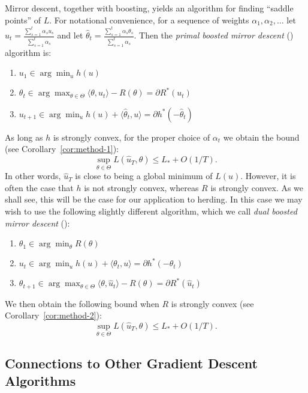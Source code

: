 \documentclass[paper.tex]{subfiles}
\begin{document}
Mirror descent, together with boosting, yields an algorithm for finding 
``saddle points'' of $L$. 
For notational convenience, for a sequence of weights $\alpha_1,\alpha_2,\ldots$ 
let $\hat{u}_t = \frac{\sum_{s=1}^t \alpha_su_s}{\sum_{s=1}^t \alpha_s}$ and let 
$\hat{\theta}_t = \frac{\sum_{s=1}^t \alpha_s\theta_s}{\sum_{s=1}^t \alpha_s}$. Then 
the {\em primal boosted mirror descent} (\primal) algorithm is:
\begin{enumerate}
\item $u_1 \in \arg\min_u h(u)$
\item $\theta_{t} \in \arg\max_{\theta \in \Theta} \langle \theta, u_t \rangle - R(\theta) = \partial R^{*}(u_{t})$
\item $u_{t+1} \in \arg\min_{u} h(u) + \langle \hat{\theta}_t, u \rangle = \partial h^{*}(-\hat\theta_{t})$
\end{enumerate}
As long as $h$ is strongly convex, for the proper choice of $\alpha_{t}$ we obtain the 
bound (see Corollary~\ref{cor:method-1}):
\begin{equation}
\sup_{\theta \in \Theta} L(\hat{u}_T, \theta) \leq L_{*} + O(1/T).
\end{equation}
In other words, $\hat{u}_T$ is close to being a global minimum of $L(u)$.
However, it is often the case that $h$ is not strongly convex, whereas $R$ is strongly convex. As we shall see, this will be the case for our application to herding.
In this case we may wish to use the following slightly different algorithm, which we call {\em dual boosted mirror descent} (\dual):
\begin{enumerate}
\item $\theta_1 \in \arg\min_{\theta} R(\theta)$
\item $u_t \in \arg\min_{u} h(u) + \langle \theta_t, u \rangle = \partial h^{*}(-\theta_{t})$
\item $\theta_{t+1} \in \arg\max_{\theta \in \Theta} \langle \theta, \hat{u}_t \rangle - R(\theta) = \partial R^{*}(\hat u_{t})$
\end{enumerate}
We then obtain the following bound 
when $R$ is strongly convex (see Corollary~\ref{cor:method-2}):
\[ \sup_{\theta \in \Theta} L(\hat{u}_T, \theta) \leq L_{*} + O(1/T). \]



\subsection{Connections to Other Gradient Descent Algorithms}
\end{document}
